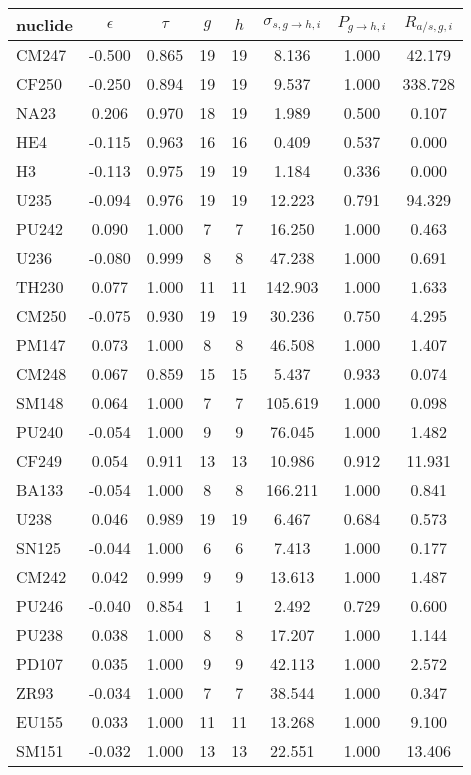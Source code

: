 \begin{tabular}{|l|ccccccc|}
\hline
nuclide & $\epsilon$ & $\tau$ & $g$ & $h$ & $\sigma_{s,g\to h,i}$ & $P_{g\to h,i}$ & $R_{a/s,g,i}$\\
\hline
CM247 & -0.500 & 0.865 & 19 & 19 & 8.136 & 1.000 & 42.179\\
CF250 & -0.250 & 0.894 & 19 & 19 & 9.537 & 1.000 & 338.728\\
NA23 & 0.206 & 0.970 & 18 & 19 & 1.989 & 0.500 & 0.107\\
HE4 & -0.115 & 0.963 & 16 & 16 & 0.409 & 0.537 & 0.000\\
H3 & -0.113 & 0.975 & 19 & 19 & 1.184 & 0.336 & 0.000\\
U235 & -0.094 & 0.976 & 19 & 19 & 12.223 & 0.791 & 94.329\\
PU242 & 0.090 & 1.000 & 7 & 7 & 16.250 & 1.000 & 0.463\\
U236 & -0.080 & 0.999 & 8 & 8 & 47.238 & 1.000 & 0.691\\
TH230 & 0.077 & 1.000 & 11 & 11 & 142.903 & 1.000 & 1.633\\
CM250 & -0.075 & 0.930 & 19 & 19 & 30.236 & 0.750 & 4.295\\
PM147 & 0.073 & 1.000 & 8 & 8 & 46.508 & 1.000 & 1.407\\
CM248 & 0.067 & 0.859 & 15 & 15 & 5.437 & 0.933 & 0.074\\
SM148 & 0.064 & 1.000 & 7 & 7 & 105.619 & 1.000 & 0.098\\
PU240 & -0.054 & 1.000 & 9 & 9 & 76.045 & 1.000 & 1.482\\
CF249 & 0.054 & 0.911 & 13 & 13 & 10.986 & 0.912 & 11.931\\
BA133 & -0.054 & 1.000 & 8 & 8 & 166.211 & 1.000 & 0.841\\
U238 & 0.046 & 0.989 & 19 & 19 & 6.467 & 0.684 & 0.573\\
SN125 & -0.044 & 1.000 & 6 & 6 & 7.413 & 1.000 & 0.177\\
CM242 & 0.042 & 0.999 & 9 & 9 & 13.613 & 1.000 & 1.487\\
PU246 & -0.040 & 0.854 & 1 & 1 & 2.492 & 0.729 & 0.600\\
PU238 & 0.038 & 1.000 & 8 & 8 & 17.207 & 1.000 & 1.144\\
PD107 & 0.035 & 1.000 & 9 & 9 & 42.113 & 1.000 & 2.572\\
ZR93 & -0.034 & 1.000 & 7 & 7 & 38.544 & 1.000 & 0.347\\
EU155 & 0.033 & 1.000 & 11 & 11 & 13.268 & 1.000 & 9.100\\
SM151 & -0.032 & 1.000 & 13 & 13 & 22.551 & 1.000 & 13.406\\

\end{tabular}
